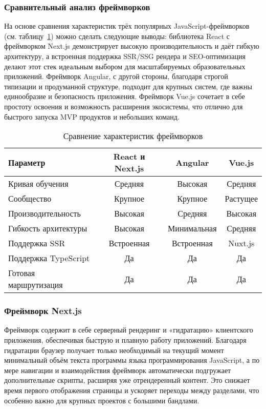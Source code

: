 \subsubsection{Сравнительный анализ фреймворков}

На основе сравнения характеристик трёх популярных JavaScript-фреймворков (см. таблицу~\ref{tab:framework-comparison}) можно сделать следующие выводы: библиотека React с фреймворком Next.js демонстрирует высокую производительность и даёт гибкую архитектуру, а встроенная поддержка SSR/SSG рендера и SEO-оптимизация делают этот стек идеальным выбором для масштабируемых образовательных приложений. Фреймворк Angular, с другой стороны, благодаря строгой типизации и продуманной структуре, подходит для крупных систем, где важны единообразие и безопасность приложения. Фреймворк Vue.js сочетает в себе простоту освоения и возможность расширения экосистемы, что отлично для быстрого запуска MVP продуктов и небольших команд.

\begin{table}[h]
  \small
  \centering
  \caption{Сравнение характеристик фреймворков}
  \label{tab:framework-comparison}
  \begin{tabular}{|l|c|c|c|}
  	\hline
  	\textbf{Параметр}     & React и Next.js &   Angular   &  Vue.js  \\ \hline
  	Кривая обучения       &     Средняя     &   Высокая   & Средняя  \\ \hline
  	Сообщество            &     Крупное     &   Крупное   & Растущее \\ \hline
  	Производительность    &     Высокая     &   Средняя   & Высокая  \\ \hline
  	Гибкость архитектуры  &     Высокая     & Минимальная & Средняя  \\ \hline
  	Поддержка SSR         &   Встроенная    & Встроенная  & Nuxt.js  \\ \hline
  	Поддержка TypeScript  &       Да        &     Да      &    Да    \\ \hline
  	Готовая маршрутизация &       Да        &     Да      &    Да    \\ \hline
  \end{tabular}
\end{table}

\subsubsection*{Фреймворк Next.js}

Фреймворк содержит в себе серверный рендеринг и «гидратацию» клиентского приложения, обеспечивая быструю и плавную работу приложений. Благодаря гидратации браузер получает только необходимый на текущий момент минимальный объём текста программы языка программирования JavaScript, а по мере навигации и взаимодействия фреймворк автоматически подгружает дополнительные скрипты, расширяя уже отрендеренный контент. Это снижает время первого отображения страницы и ускоряет переходы между разделами, что особенно важно для крупных проектов с большими бандлами.

